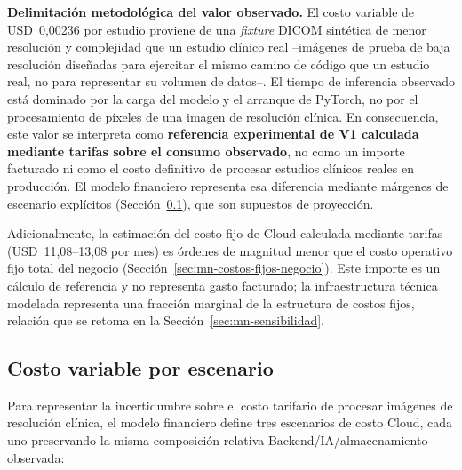 \textbf{Delimitación metodológica del valor observado.} El costo variable de USD~0,00236 por estudio proviene de una \textit{fixture} DICOM sintética de menor resolución y complejidad que un estudio clínico real --imágenes de prueba de baja resolución diseñadas para ejercitar el mismo camino de código que un estudio real, no para representar su volumen de datos--. El tiempo de inferencia observado está dominado por la carga del modelo y el arranque de PyTorch, no por el procesamiento de píxeles de una imagen de resolución clínica. En consecuencia, este valor se interpreta como \textbf{referencia experimental de V1 calculada mediante tarifas sobre el consumo observado}, no como un importe facturado ni como el costo definitivo de procesar estudios clínicos reales en producción. El modelo financiero representa esa diferencia mediante márgenes de escenario explícitos (Sección~\ref{sec:mn-costos-escenarios}), que son supuestos de proyección.

Adicionalmente, la estimación del costo fijo de Cloud calculada mediante tarifas (USD~11,08--13,08 por mes) es órdenes de magnitud menor que el costo operativo fijo total del negocio (Sección~\ref{sec:mn-costos-fijos-negocio}). Este importe es un cálculo de referencia y no representa gasto facturado; la infraestructura técnica modelada representa una fracción marginal de la estructura de costos fijos, relación que se retoma en la Sección~\ref{sec:mn-sensibilidad}.

\subsection{Costo variable por escenario}
\label{sec:mn-costos-escenarios}

Para representar la incertidumbre sobre el costo tarifario de procesar imágenes de resolución clínica, el modelo financiero define tres escenarios de costo Cloud, cada uno preservando la misma composición relativa Backend/IA/almacenamiento observada:

